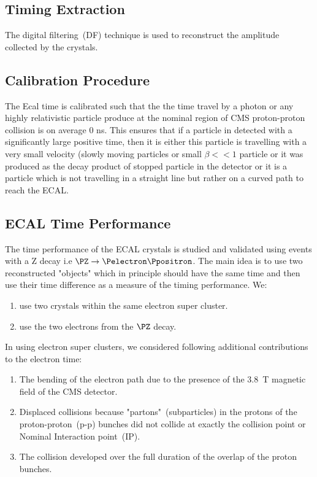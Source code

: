
\subsection{Timing Extraction}
The digital  filtering~(DF) technique is used to reconstruct the amplitude collected by the \pb crystals.

\subsection{Calibration Procedure}
The Ecal time is calibrated such that the the time travel by a photon or any highly relativistic  particle  produce at the nominal region of CMS proton-proton collision is on average 0 ns. This ensures that if a particle in detected with a significantly large positive time, then it is either this particle is travelling with a very small velocity (slowly moving particles or small $\beta << 1$ particle or it was produced as the decay product of stopped particle in the detector or it is a particle which is not travelling in a straight line but rather on a curved path to reach the ECAL.
\subsection{ECAL Time Performance}
The time performance of the ECAL crystals is studied and validated using events with a Z decay  i.e $\PZ \rightarrow \Pelectron \Ppositron$. 
\newline
The main idea is to use two reconstructed "objects" which in principle should have the same time and then use their time difference as a measure of the timing performance. We:
\begin{enumerate}
\item use two crystals within the same electron super cluster.
\item use the two electrons from the $\PZ$ decay. 
\end{enumerate}
In using electron super clusters, we considered following additional contributions to the electron time:
\begin{enumerate}
\item The bending of the electron path due to the presence of the 3.8~T magnetic field of the CMS detector.
\item  Displaced collisions  because "partons"~(subparticles) in the protons of the proton-proton~(p-p) bunches did not collide at exactly the collision point or Nominal Interaction point~(IP).
\item The collision developed over the full duration of the overlap of the proton bunches.
\end{enumerate}

